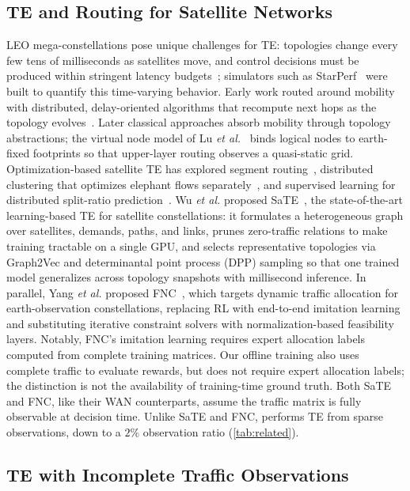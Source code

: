 \subsection{TE and Routing for Satellite Networks}

LEO mega-constellations pose unique challenges for TE: topologies change
every few tens of milliseconds as satellites move, and control decisions
must be produced within stringent latency
budgets~\cite{handley2018,bhattacherjee2019,kassing2020}; simulators such as
StarPerf~\cite{lai2020} were built to quantify this time-varying behavior.
Early work routed around mobility with distributed, delay-oriented
algorithms that recompute next hops as the topology
evolves~\cite{ekici2001}. Later classical
approaches
absorb mobility through topology abstractions; the virtual node model of Lu
\emph{et al.}~\cite{vn2013} binds logical nodes to earth-fixed footprints so
that upper-layer routing observes a quasi-static grid. Optimization-based
satellite TE has explored segment routing~\cite{hu2022}, distributed
clustering that optimizes elephant flows separately~\cite{wei2024}, and
supervised learning for distributed split-ratio prediction~\cite{flexsate2024}.
Wu \emph{et al.} proposed SaTE~\cite{sate}, the
state-of-the-art learning-based TE for satellite constellations: it
formulates a heterogeneous graph over satellites, demands, paths, and links,
prunes zero-traffic relations to make training tractable on a single GPU,
and selects representative topologies via Graph2Vec and determinantal point
process (DPP) sampling so that
one trained model generalizes across topology snapshots with millisecond
inference. In parallel, Yang \emph{et al.} proposed FNC~\cite{fnc,fnc-infocom},
which targets dynamic traffic
allocation for earth-observation constellations, replacing RL with
end-to-end imitation learning and substituting iterative constraint solvers
with normalization-based feasibility layers. Notably, FNC's imitation
learning requires expert allocation labels computed from complete training
matrices. Our offline training also uses complete traffic to evaluate rewards,
but does not require expert allocation labels; the distinction is not the
availability of training-time ground truth. Both SaTE and FNC, like their WAN counterparts,
assume the traffic matrix is fully observable at decision time. Unlike SaTE
and FNC, \sysname{} performs TE from sparse observations, down to a $2\%$
observation ratio (\cref{tab:related}).

\subsection{TE with Incomplete Traffic Observations}

